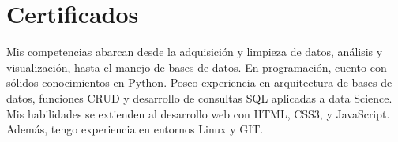 \documentclass[a4paper,10pt]{article}
\begin{document}
	\section*{Certificados}
	\small      
	Mis competencias abarcan desde la adquisición y limpieza de datos, análisis y visualización, hasta el manejo de bases de datos.  En programación, cuento con sólidos conocimientos en Python. Poseo experiencia en arquitectura de bases de datos, funciones CRUD y desarrollo de consultas SQL aplicadas a data Science. Mis habilidades se extienden al desarrollo web con HTML, CSS3, y JavaScript. Además, tengo experiencia en entornos Linux y GIT. 
\end{document}

